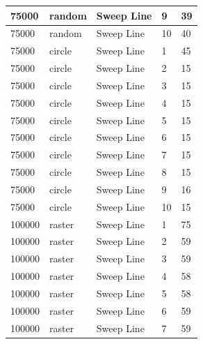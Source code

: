 \documentclass[12pt]{article}
\begin{document}
\begin{longtable}{|l|l|l|l|l|}
75000        & random            & Sweep Line & 9          & 39                            \\ \hline
75000        & random            & Sweep Line & 10         & 40                            \\ \hline
75000        & circle            & Sweep Line & 1          & 45                            \\ \hline
75000        & circle            & Sweep Line & 2          & 15                            \\ \hline
75000        & circle            & Sweep Line & 3          & 15                            \\ \hline
75000        & circle            & Sweep Line & 4          & 15                            \\ \hline
75000        & circle            & Sweep Line & 5          & 15                            \\ \hline
75000        & circle            & Sweep Line & 6          & 15                            \\ \hline
75000        & circle            & Sweep Line & 7          & 15                            \\ \hline
75000        & circle            & Sweep Line & 8          & 15                            \\ \hline
75000        & circle            & Sweep Line & 9          & 16                            \\ \hline
75000        & circle            & Sweep Line & 10         & 15                            \\ \hline
100000       & raster            & Sweep Line & 1          & 75                            \\ \hline
100000       & raster            & Sweep Line & 2          & 59                            \\ \hline
100000       & raster            & Sweep Line & 3          & 59                            \\ \hline
100000       & raster            & Sweep Line & 4          & 58                            \\ \hline
100000       & raster            & Sweep Line & 5          & 58                            \\ \hline
100000       & raster            & Sweep Line & 6          & 59                            \\ \hline
100000       & raster            & Sweep Line & 7          & 59                            \\ \hline

\end{longtable}
\end{document}
